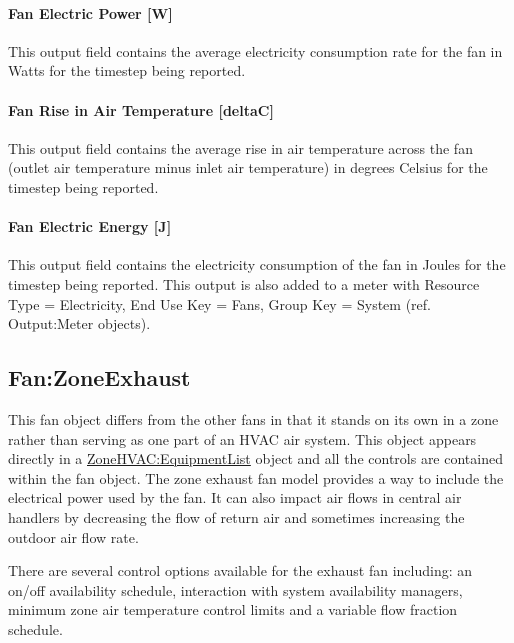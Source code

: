 \paragraph{Fan Electric Power {[}W{]}}\label{fan-electric-power-w-2}

This output field contains the average electricity consumption rate for the fan in Watts for the timestep being reported.

\paragraph{Fan Rise in Air Temperature {[}deltaC{]}}\label{fan-rise-in-air-temperature-deltac-2}

This output field contains the average rise in air temperature across the fan (outlet air temperature minus inlet air temperature) in degrees Celsius for the timestep being reported.

\paragraph{Fan Electric Energy {[}J{]}}\label{fan-electric-energy-j-2}

This output field contains the electricity consumption of the fan in Joules for the timestep being reported. This output is also added to a meter with Resource Type = Electricity, End Use Key = Fans, Group Key = System (ref. Output:Meter objects).

\subsection{Fan:ZoneExhaust}\label{fanzoneexhaust}

This fan object differs from the other fans in that it stands on its own in a zone rather than serving as one part of an HVAC air system. This object appears directly in a \hyperref[zonehvacequipmentlist]{ZoneHVAC:EquipmentList} object and all the controls are contained within the fan object. The zone exhaust fan model provides a way to include the electrical power used by the fan. It can also impact air flows in central air handlers by decreasing the flow of return air and sometimes increasing the outdoor air flow rate.

There are several control options available for the exhaust fan including: an on/off availability schedule, interaction with system availability managers, minimum zone air temperature control limits and a variable flow fraction schedule.

